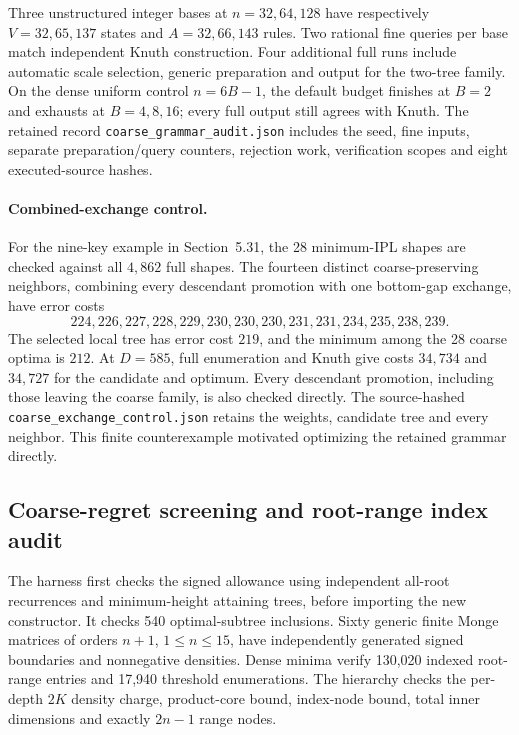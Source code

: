 \documentclass[11pt]{article}
\begin{document}
Three unstructured integer bases at $n=32,64,128$ have respectively
$V=32,65,137$ states and $A=32,66,143$ rules. Two rational fine queries per base
match independent Knuth construction. Four additional full runs include
automatic scale selection, generic preparation and output for the
two-tree family. On the dense uniform control $n=6B-1$, the default
budget finishes at $B=2$ and exhausts at $B=4,8,16$; every full output
still agrees with Knuth. The retained record
\texttt{coarse\_grammar\_audit.json} includes the seed, fine inputs,
separate preparation/query counters, rejection work, verification scopes
and eight executed-source hashes.

\paragraph{Combined-exchange control.}
For the nine-key example in Section~5.31, the
28 minimum-IPL shapes are checked against all $4{,}862$ full shapes.
The fourteen distinct coarse-preserving neighbors, combining every
descendant promotion with one bottom-gap exchange, have error costs
\[
224,226,227,228,229,230,230,230,231,231,234,235,238,239.
\]
The selected local tree has error cost $219$, and the minimum among
the 28 coarse optima is $212$. At $D=585$, full enumeration and Knuth
give costs $34{,}734$ and $34{,}727$ for the candidate and optimum.
Every descendant promotion, including those leaving the coarse family,
is also checked directly. The source-hashed
\texttt{coarse\_exchange\_control.json} retains the weights, candidate
tree and every neighbor. This finite counterexample motivated optimizing
the retained grammar directly.


\subsection{Coarse-regret screening and root-range index audit}
\label{app:coarse-screen}
The harness first checks the signed allowance using independent all-root
recurrences and minimum-height attaining trees, before importing the new
constructor. It checks 540 optimal-subtree inclusions. Sixty generic finite
Monge matrices of orders $n+1$, $1\le n\le15$, have independently generated
signed boundaries and nonnegative densities. Dense minima verify 130,020
indexed root-range entries and 17,940 threshold enumerations. The hierarchy
checks the per-depth $2K$ density charge, product-core bound, index-node
bound, total inner dimensions and exactly $2n-1$ range nodes.
\end{document}
